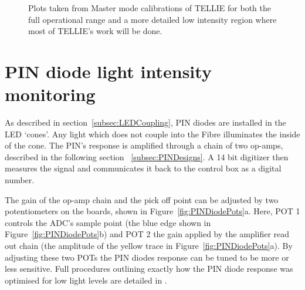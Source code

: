 \documentclass[12pt]{report}
\begin{document}
\begin{figure}
	\centering
	\caption{Plots taken from Master mode calibrations of TELLIE for both the full operational range and a more detailed low intensity region where most of TELLIE's work will be done.}
	\label{fig:IntensitySweeping} 
\end{figure}

\section{PIN diode light intensity monitoring}
\label{sec:PIN}
As described in section~\ref{subsec:LEDCoupling}, PIN diodes are installed in the LED `cones'. Any light which does not couple into the Fibre illuminates the inside of the cone. The PIN's response is amplified through a chain of two op-amps, described in the following section ~\ref{subsec:PINDesigns}. A 14 bit digitizer then measures the signal and communicates it back to the control box as a digital number. 

The gain of the op-amp chain and the pick off point can be adjusted by two potentiometers on the boards, shown in Figure~\ref{fig:PINDiodePots}a. Here, POT 1 controls the ADC's sample point (the blue edge shown in Figure~\ref{fig:PINDiodePots}b) and POT 2 the gain applied by the amplifier read out chain (the amplitude of the yellow trace in Figure~\ref{fig:PINDiodePots}a). By adjusting these two POTs the PIN diodes response can be tuned to be more or less sensitive. Full procedures outlining exactly how the PIN diode response was optimised for low light levels are detailed in \cite{tellieCalibProceedures}. 
\end{document}
